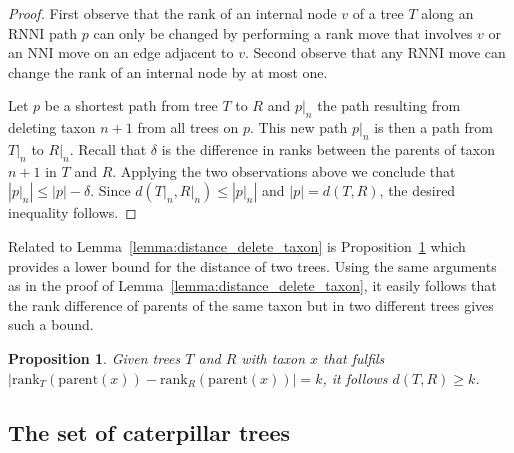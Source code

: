 \documentclass{amsart}
\newcommand{\parent}{\mathrm{parent}}
\newcommand{\rank}{\mathrm{rank}}
\newcommand{\nni}{\mathrm{NNI}}
\newcommand{\rnni}{\mathrm{RNNI}}
\newtheorem{proposition}[definition]{Proposition}
\begin{document}
\begin{proof}
First observe that the rank of an internal node $v$ of a tree $T$ along an $\rnni$ path $p$ can only be changed by performing a rank move that involves $v$ or an $\nni$ move on an edge adjacent to $v$.
Second observe that any $\rnni$ move can change the rank of an internal node by at most one.

Let $p$ be a shortest path from tree $T$ to $R$ and $p{\big|}_n$ the path resulting from deleting taxon $n+1$ from all trees on $p$.
This new path $p{\big|}_n$ is then a path from $T{\big|}_n$ to $R{\big|}_n$.
Recall that $\delta$ is the difference in ranks between the parents of taxon $n+1$ in $T$ and $R$.
Applying the two observations above we conclude that $|p{\big|}_n| \leq |p| - \delta$.
Since $d(T{\big|}_n,R{\big|}_n) \leq |p{\big|}_n|$ and $|p| = d(T,R)$, the desired inequality follows.
\end{proof}

Related to Lemma~\ref{lemma:distance_delete_taxon} is Proposition~\ref{proposition:lower_bound_distance} which provides a lower bound for the distance of two trees.
Using the same arguments as in the proof of Lemma~\ref{lemma:distance_delete_taxon}, it easily follows that the rank difference of parents of the same taxon but in two different trees gives such a bound.

\begin{proposition}
    Given trees $T$ and $R$ with taxon $x$ that fulfils $|\rank_T(\parent(x)) - \rank_R(\parent(x))| = k$, it follows $d(T,R) \geq k$.
    \label{proposition:lower_bound_distance}
\end{proposition}

\subsection{The set of caterpillar trees}
\label{section:caterpillar_convex}
\end{document}
